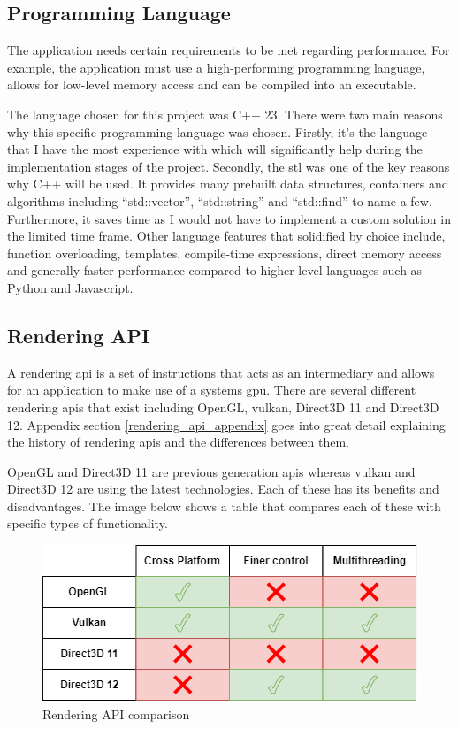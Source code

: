 \documentclass[11pt]{article}
\begin{document}
\subsection{Programming Language}
The application needs certain requirements to be met regarding performance. For
example, the application must use a high-performing programming language, allows
for low-level memory access and can be compiled into an executable.

The language chosen for this project was C++ 23.  There were two main reasons
why this specific programming language was chosen. Firstly, it's the language
that I have the most experience with which will significantly help during the
implementation stages of the project. Secondly, the \gls{stl}  was one of the
key reasons why C++ will be used. It provides many prebuilt data structures,
containers and algorithms including ``std::vector'', ``std::string'' and
``std::find'' to name a few. Furthermore, it saves time as I would not have to
implement a custom solution in the limited time frame. Other language features
that solidified by choice include, function overloading, templates, compile-time
expressions, direct memory access and generally faster performance compared to
higher-level languages such as Python and Javascript.

\subsection{Rendering API} \label{rendering_api}
A rendering \gls{api} is a set of instructions that acts as an intermediary and
allows for an application to make use of a systems \gls{gpu}. There are several
different rendering \glspl{api} that exist including OpenGL, \gls{vulkan},
Direct3D 11 and Direct3D 12. Appendix section \ref{rendering_api_appendix} goes
into great detail explaining the history of rendering \glspl{api} and the
differences between them.

OpenGL and Direct3D 11 are previous generation \glspl{api} whereas \gls{vulkan}
and Direct3D 12 are using the latest technologies. Each of these has its
benefits and disadvantages. The image below shows a table that compares each of
these with specific types of functionality. 
\begin{figure}[h!]
  \centering
  \includegraphics[width=\textwidth]{images/api_comparison.png}
  \caption{Rendering API comparison}
  \label{fig:api_comparison}
\end{figure}
\end{document}
